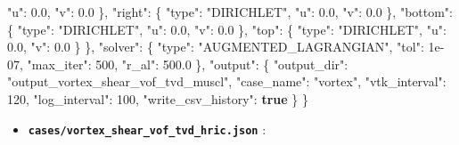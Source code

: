 \documentclass[
  10pt,
]{article}
\newenvironment{Shaded}{}{}
\newcommand{\DataTypeTok}[1]{\textcolor[rgb]{0.56,0.13,0.00}{#1}}
\newcommand{\DecValTok}[1]{\textcolor[rgb]{0.25,0.63,0.44}{#1}}
\newcommand{\FloatTok}[1]{\textcolor[rgb]{0.25,0.63,0.44}{#1}}
\newcommand{\FunctionTok}[1]{\textcolor[rgb]{0.02,0.16,0.49}{#1}}
\newcommand{\KeywordTok}[1]{\textcolor[rgb]{0.00,0.44,0.13}{\textbf{#1}}}
\newcommand{\StringTok}[1]{\textcolor[rgb]{0.25,0.44,0.63}{#1}}
\providecommand{\tightlist}{%
  \setlength{\itemsep}{0pt}\setlength{\parskip}{0pt}}
\begin{document}
\begin{Shaded}
\begin{Highlighting}[]
      \DataTypeTok{"u"}\FunctionTok{:} \FloatTok{0.0}\FunctionTok{,}
      \DataTypeTok{"v"}\FunctionTok{:} \FloatTok{0.0}
    \FunctionTok{\},}
    \DataTypeTok{"right"}\FunctionTok{:} \FunctionTok{\{}
      \DataTypeTok{"type"}\FunctionTok{:} \StringTok{"DIRICHLET"}\FunctionTok{,}
      \DataTypeTok{"u"}\FunctionTok{:} \FloatTok{0.0}\FunctionTok{,}
      \DataTypeTok{"v"}\FunctionTok{:} \FloatTok{0.0}
    \FunctionTok{\},}
    \DataTypeTok{"bottom"}\FunctionTok{:} \FunctionTok{\{}
      \DataTypeTok{"type"}\FunctionTok{:} \StringTok{"DIRICHLET"}\FunctionTok{,}
      \DataTypeTok{"u"}\FunctionTok{:} \FloatTok{0.0}\FunctionTok{,}
      \DataTypeTok{"v"}\FunctionTok{:} \FloatTok{0.0}
    \FunctionTok{\},}
    \DataTypeTok{"top"}\FunctionTok{:} \FunctionTok{\{}
      \DataTypeTok{"type"}\FunctionTok{:} \StringTok{"DIRICHLET"}\FunctionTok{,}
      \DataTypeTok{"u"}\FunctionTok{:} \FloatTok{0.0}\FunctionTok{,}
      \DataTypeTok{"v"}\FunctionTok{:} \FloatTok{0.0}
    \FunctionTok{\}}
  \FunctionTok{\},}
  \DataTypeTok{"solver"}\FunctionTok{:} \FunctionTok{\{}
    \DataTypeTok{"type"}\FunctionTok{:} \StringTok{"AUGMENTED\_LAGRANGIAN"}\FunctionTok{,}
    \DataTypeTok{"tol"}\FunctionTok{:} \DecValTok{1e{-}07}\FunctionTok{,}
    \DataTypeTok{"max\_iter"}\FunctionTok{:} \DecValTok{500}\FunctionTok{,}
    \DataTypeTok{"r\_al"}\FunctionTok{:} \FloatTok{500.0}
  \FunctionTok{\},}
  \DataTypeTok{"output"}\FunctionTok{:} \FunctionTok{\{}
    \DataTypeTok{"output\_dir"}\FunctionTok{:} \StringTok{"output\_vortex\_shear\_vof\_tvd\_muscl"}\FunctionTok{,}
    \DataTypeTok{"case\_name"}\FunctionTok{:} \StringTok{"vortex"}\FunctionTok{,}
    \DataTypeTok{"vtk\_interval"}\FunctionTok{:} \DecValTok{120}\FunctionTok{,}
    \DataTypeTok{"log\_interval"}\FunctionTok{:} \DecValTok{100}\FunctionTok{,}
    \DataTypeTok{"write\_csv\_history"}\FunctionTok{:} \KeywordTok{true}
  \FunctionTok{\}}
\FunctionTok{\}}
\end{Highlighting}
\end{Shaded}

\begin{itemize}
\tightlist
\item
  \textbf{\texttt{cases/vortex\_shear\_vof\_tvd\_hric.json}} :
\end{itemize}
\end{document}
